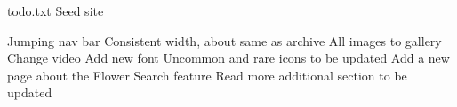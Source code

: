 todo.txt Seed site

Jumping nav bar
Consistent width, about same as archive
All images to gallery
Change video
Add new font
Uncommon and rare icons to be updated
Add a new page about the Flower
Search feature
Read more additional section to be updated
